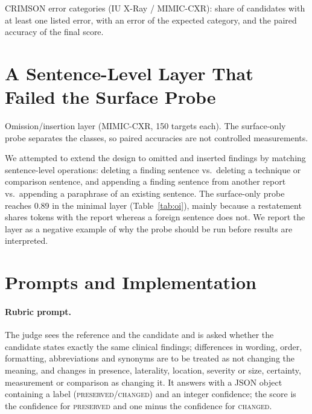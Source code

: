 \documentclass[11pt]{article}
\begin{document}
\begin{table}[t]
\centering
\small
\begin{adjustbox}{max width=\textwidth}

\end{adjustbox}
\caption{CRIMSON error categories (IU X-Ray / MIMIC-CXR): share of candidates with at least one listed error, with an error of the expected category, and the paired accuracy of the final score.}
\label{tab:crimson}
\end{table}

\section{A Sentence-Level Layer That Failed the Surface Probe}
\label{app:oi}

\begin{table}[t]
\centering
\small
\begin{adjustbox}{max width=\columnwidth}

\end{adjustbox}
\caption{Omission/insertion layer (MIMIC-CXR, 150 targets each). The surface-only probe separates the classes, so paired accuracies are not controlled measurements.}
\label{tab:oi}
\end{table}

We attempted to extend the design to omitted and inserted findings by matching sentence-level operations: deleting a finding sentence vs.\ deleting a technique or comparison sentence, and appending a finding sentence from another report vs.\ appending a paraphrase of an existing sentence. The surface-only probe reaches 0.89 in the minimal layer (Table~\ref{tab:oi}), mainly because a restatement shares tokens with the report whereas a foreign sentence does not. We report the layer as a negative example of why the probe should be run before results are interpreted.

\section{Prompts and Implementation}
\label{app:prompts}

\paragraph{Rubric prompt.} The judge sees the reference and the candidate and is asked whether the candidate states exactly the same clinical findings; differences in wording, order, formatting, abbreviations and synonyms are to be treated as not changing the meaning, and changes in presence, laterality, location, severity or size, certainty, measurement or comparison as changing it. It answers with a JSON object containing a label (\textsc{preserved}/\textsc{changed}) and an integer confidence; the score is the confidence for \textsc{preserved} and one minus the confidence for \textsc{changed}.
\end{document}

